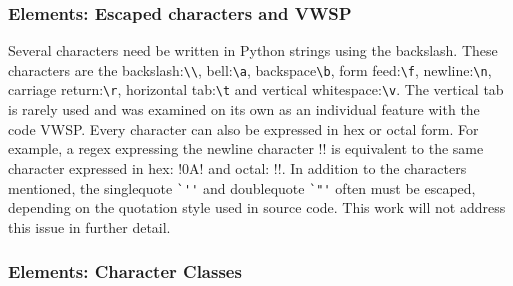 \subsubsection{Elements: Escaped characters and VWSP}

Several characters need be written in Python strings using the backslash.  These characters are the backslash:\verb!\\!, bell:\verb!\a!, backspace\verb!\b!, form feed:\verb!\f!, newline:\verb!\n!, carriage return:\verb!\r!, horizontal tab:\verb!\t! and vertical whitespace:\verb!\v!.  The vertical tab is rarely used and was examined on its own as an individual feature with the code VWSP.  Every character can also be expressed in hex or octal form.  For example, a regex expressing the newline character \cverb!\n! is equivalent to the same character expressed in hex: \cverb!\x0A! and octal: \cverb!!.  In addition to the characters mentioned, the singlequote \verb!`''! and doublequote \verb!`"'! often must be escaped, depending on the quotation style used in source code.  This work will not address this issue in further detail.

\subsubsection{Elements: Character Classes}


